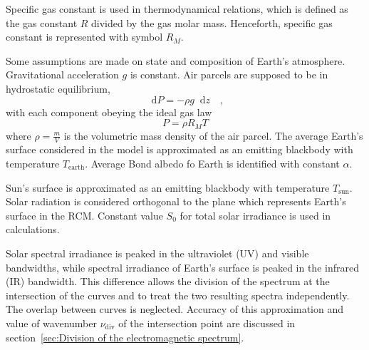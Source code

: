 \documentclass[a4paper,10pt,final,twocolumn]{article}
\newcommand{\dd}{\mathop{}\!\mathrm{d}}
\begin{document}
Specific gas constant is used in thermodynamical relations, which is defined as the gas constant $R$ divided by the gas molar mass. Henceforth, specific gas constant is represented with symbol $R_M$.

Some assumptions are made on state and composition of Earth's atmosphere. Gravitational acceleration $g$ is constant. Air parcels are supposed to be in hydrostatic equilibrium,
\begin{equation}
  \label{eq:hydrostatic_equilibrium}
  \dd P = - \rho g \dd z
  \quad ,
\end{equation}
with each component obeying the ideal gas law
\begin{equation}
  \label{eq:ideal_gas_law}
  P = \rho R_M T
\end{equation}
where $\rho = \frac{m}{V}$ is the volumetric mass density of the air parcel.
The average Earth's surface considered in the model is approximated as an emitting blackbody with temperature $T_\text{earth}$. Average Bond albedo fo Earth is identified with constant $\alpha$.

Sun's surface is approximated as an emitting blackbody with temperature $T_\text{sun}$. Solar radiation is considered orthogonal to the plane which represents Earth's surface in the RCM. Constant value $S_0$ for total solar irradiance is used in calculations.

Solar spectral irradiance is peaked in the ultraviolet (UV) and visible bandwidths, while spectral irradiance of Earth's surface is peaked in the infrared (IR) bandwidth. This difference allows the division of the spectrum at the intersection of the curves and to treat the two resulting spectra independently. The overlap between curves is neglected. Accuracy of this approximation and value of wavenumber $\nu_\text{div}$ of the intersection point are discussed in section~\ref{sec:Division of the electromagnetic spectrum}.
\end{document}
